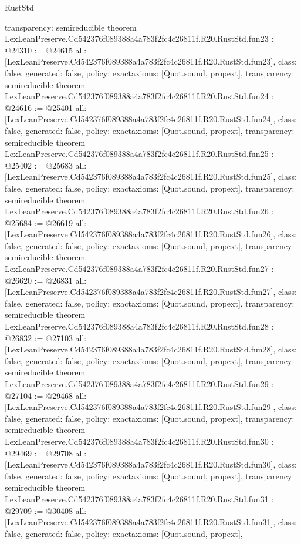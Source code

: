 \begin{lexlean}{RustStd}
\begin{coremodule}
{  transparency: semireducible
}
theorem LexLeanPreserve.Cd542376f089388a4a783f2fc4c26811f.R20.RustStd.fun23 : @24310 := @24615 {
  all: [LexLeanPreserve.Cd542376f089388a4a783f2fc4c26811f.R20.RustStd.fun23],
  class: false,
  generated: false,
  policy: exact{axioms: [Quot.sound, propext]},
  transparency: semireducible
}
theorem LexLeanPreserve.Cd542376f089388a4a783f2fc4c26811f.R20.RustStd.fun24 : @24616 := @25401 {
  all: [LexLeanPreserve.Cd542376f089388a4a783f2fc4c26811f.R20.RustStd.fun24],
  class: false,
  generated: false,
  policy: exact{axioms: [Quot.sound, propext]},
  transparency: semireducible
}
theorem LexLeanPreserve.Cd542376f089388a4a783f2fc4c26811f.R20.RustStd.fun25 : @25402 := @25683 {
  all: [LexLeanPreserve.Cd542376f089388a4a783f2fc4c26811f.R20.RustStd.fun25],
  class: false,
  generated: false,
  policy: exact{axioms: [Quot.sound, propext]},
  transparency: semireducible
}
theorem LexLeanPreserve.Cd542376f089388a4a783f2fc4c26811f.R20.RustStd.fun26 : @25684 := @26619 {
  all: [LexLeanPreserve.Cd542376f089388a4a783f2fc4c26811f.R20.RustStd.fun26],
  class: false,
  generated: false,
  policy: exact{axioms: [Quot.sound, propext]},
  transparency: semireducible
}
theorem LexLeanPreserve.Cd542376f089388a4a783f2fc4c26811f.R20.RustStd.fun27 : @26620 := @26831 {
  all: [LexLeanPreserve.Cd542376f089388a4a783f2fc4c26811f.R20.RustStd.fun27],
  class: false,
  generated: false,
  policy: exact{axioms: [Quot.sound, propext]},
  transparency: semireducible
}
theorem LexLeanPreserve.Cd542376f089388a4a783f2fc4c26811f.R20.RustStd.fun28 : @26832 := @27103 {
  all: [LexLeanPreserve.Cd542376f089388a4a783f2fc4c26811f.R20.RustStd.fun28],
  class: false,
  generated: false,
  policy: exact{axioms: [Quot.sound, propext]},
  transparency: semireducible
}
theorem LexLeanPreserve.Cd542376f089388a4a783f2fc4c26811f.R20.RustStd.fun29 : @27104 := @29468 {
  all: [LexLeanPreserve.Cd542376f089388a4a783f2fc4c26811f.R20.RustStd.fun29],
  class: false,
  generated: false,
  policy: exact{axioms: [Quot.sound, propext]},
  transparency: semireducible
}
theorem LexLeanPreserve.Cd542376f089388a4a783f2fc4c26811f.R20.RustStd.fun30 : @29469 := @29708 {
  all: [LexLeanPreserve.Cd542376f089388a4a783f2fc4c26811f.R20.RustStd.fun30],
  class: false,
  generated: false,
  policy: exact{axioms: [Quot.sound, propext]},
  transparency: semireducible
}
theorem LexLeanPreserve.Cd542376f089388a4a783f2fc4c26811f.R20.RustStd.fun31 : @29709 := @30408 {
  all: [LexLeanPreserve.Cd542376f089388a4a783f2fc4c26811f.R20.RustStd.fun31],
  class: false,
  generated: false,
  policy: exact{axioms: [Quot.sound, propext]},
}
\end{coremodule}
\end{lexlean}
